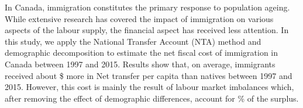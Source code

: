 In Canada, immigration constitutes the primary response to population ageing. While extensive research has covered the impact of immigration on various aspects of the labour supply, the financial aspect has received less attention.
In this study, we apply the National Transfer Account (NTA) method and demographic decomposition to estimate the net fiscal cost of immigration in Canada between 1997 and 2015.
Results show that, on average, immigrants received about \$ more in Net transfer per capita than natives between 1997 and 2015.
However, this cost is mainly the result of labour market imbalances which, after removing the effect of demographic differences, account for \% of the surplus.